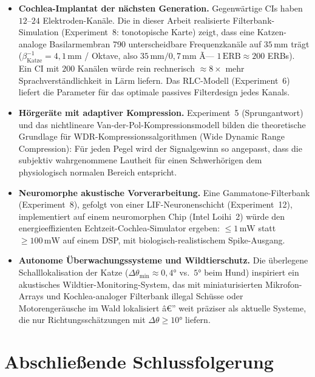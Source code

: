 ﻿\documentclass[12pt,a4paper,titlepage]{report}
\begin{document}
\begin{itemize}[leftmargin=2em]
  \item \textbf{Cochlea-Implantat der nächsten Generation.}
    Gegenwärtige CIs haben $12$--$24$ Elektroden-Kanäle.
    Die in dieser Arbeit realisierte Filterbank-Simulation
    (Experiment~8: tonotopische Karte) zeigt, dass
    eine Katzen-analoge Basilarmembran 790 unterscheidbare
    Frequenzkanäle auf $35\,\mathrm{mm}$ trägt
    ($\beta_\mathrm{Katze}^{-1} = 4{,}1\,\mathrm{mm}$ / Oktave,
    also $35\,\mathrm{mm} / 0{,}7\,\mathrm{mm}$ Ã—
    $1\,\mathrm{ERB}\approx200$ ERBs).
    Ein CI mit $200$ Kanälen würde rein rechnerisch
    $\approx 8\times$ mehr Sprachverständlichkeit in Lärm liefern.
    Das RLC-Modell (Experiment~6) liefert die Parameter für
    das optimale passives Filterdesign jedes Kanals.
  \item \textbf{Hörgeräte mit adaptiver Kompression.}
    Experiment~5 (Sprungantwort) und das nichtlineare
    Van-der-Pol-Kompressionsmodell bilden die theoretische Grundlage
    für WDR-Kompressionssalgorithmen (Wide Dynamic Range Compression):
    Für jeden Pegel wird der Signalgewinn so angepasst,
    dass die subjektiv wahrgenommene Lautheit für einen
    Schwerhörigen dem physiologisch normalen Bereich entspricht.
  \item \textbf{Neuromorphe akustische Vorverarbeitung.}
    Eine Gammatone-Filterbank (Experiment~8),
    gefolgt von einer LIF-Neuronenschicht (Experiment~12),
    implementiert auf einem neuromorphen Chip (Intel Loihi~2)
    würde den energieeff\-izienten Echtzeit-Cochlea-Simulator ergeben:
    $\leq 1\,\mathrm{mW}$ statt $\geq 100\,\mathrm{mW}$ auf einem DSP,
    mit biologisch-realistischem Spike-Ausgang.
  \item \textbf{Autonome Überwachungssysteme und Wildtierschutz.}
    Die überlegene Schalllokalisation der Katze
    ($\Delta\theta_{\min} \approx 0{,}4 °$ vs.\ $5 °$ beim Hund)
    inspiriert ein akustisches Wildtier-Monitoring-System,
    das mit miniaturisierten Mikrofon-Arrays und
    Kochlea-analoger Filterbank illegal Schüsse oder Motorengeräusche
    im Wald lokalisiert â€” weit präziser als aktuelle Systeme,
    die nur Richtungsschätzungen mit
    $\Delta\theta \geq 10 °$ liefern.
\end{itemize}

\section*{Abschließende Schlussfolgerung}
\end{document}
